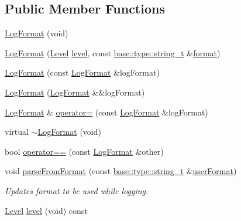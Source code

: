 \subsection*{Public Member Functions}
\begin{DoxyCompactItemize}
\item 
\hyperlink{classel_1_1base_1_1_log_format_a15469c6f25aa4a4770b1d2aeaabba145}{Log\+Format} (void)
\item 
\hyperlink{classel_1_1base_1_1_log_format_a746a49231f1b046803dd2144ae2a2c76}{Log\+Format} (\hyperlink{namespaceel_ab0ac6091262344c52dd2d3ad099e8e36}{Level} \hyperlink{classel_1_1base_1_1_log_format_a6c5d17ad378ccb6e53beb2d48143fecb}{level}, const \hyperlink{namespaceel_1_1base_1_1type_a67e406cd213c231f1d135b5a4eda64b5}{base\+::type\+::string\+\_\+t} \&\hyperlink{classel_1_1base_1_1_log_format_ac19602b3153daa9a76b56d3f4ff3beaa}{format})
\item 
\hyperlink{classel_1_1base_1_1_log_format_a8cc88ab095024bcfb90dd3ad7208f2ef}{Log\+Format} (const \hyperlink{classel_1_1base_1_1_log_format}{Log\+Format} \&log\+Format)
\item 
\hyperlink{classel_1_1base_1_1_log_format_a697d52d55c6b6c6b8e6d5ceb37d66c19}{Log\+Format} (\hyperlink{classel_1_1base_1_1_log_format}{Log\+Format} \&\&log\+Format)
\item 
\hyperlink{classel_1_1base_1_1_log_format}{Log\+Format} \& \hyperlink{classel_1_1base_1_1_log_format_a3c81e5976c3f3a8cb428eeeb3f188ac2}{operator=} (const \hyperlink{classel_1_1base_1_1_log_format}{Log\+Format} \&log\+Format)
\item 
virtual \hyperlink{classel_1_1base_1_1_log_format_a09d5b42b49f00fb37edafef1102daf0c}{$\sim$\+Log\+Format} (void)
\item 
bool \hyperlink{classel_1_1base_1_1_log_format_a31e85c6f74da6fe36d156a89a6c7fb91}{operator==} (const \hyperlink{classel_1_1base_1_1_log_format}{Log\+Format} \&other)
\item 
void \hyperlink{classel_1_1base_1_1_log_format_ab7c1b15cfdad24cfbc6dbced8b9d66eb}{parse\+From\+Format} (const \hyperlink{namespaceel_1_1base_1_1type_a67e406cd213c231f1d135b5a4eda64b5}{base\+::type\+::string\+\_\+t} \&\hyperlink{classel_1_1base_1_1_log_format_a9ca6ecd5b9342653493670d5a4e230cd}{user\+Format})
\begin{DoxyCompactList}\small\item\em Updates format to be used while logging. \end{DoxyCompactList}\item 
\hyperlink{namespaceel_ab0ac6091262344c52dd2d3ad099e8e36}{Level} \hyperlink{classel_1_1base_1_1_log_format_a6c5d17ad378ccb6e53beb2d48143fecb}{level} (void) const 

\end{DoxyCompactItemize}
